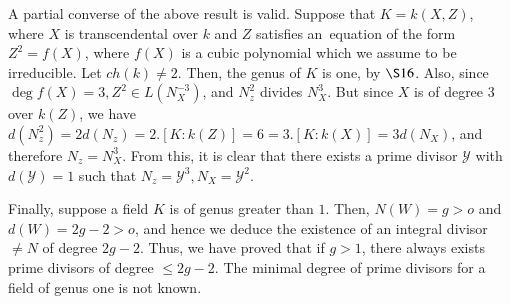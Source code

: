 A partial converse of the above result is valid. Suppose that $K = k
(X, Z)$, where $X$ is transcendental over $k$ and $Z$ satisfies an\pageoriginale\
equation of the form $Z^2 = f (X)$, where $f(X)$ is a cubic polynomial
which we assume to be irreducible. Let $ch(k) \neq 2$. Then, the genus
of $K$ is one, by $\S 16$. Also, since $\deg f(X) = 3, Z^2 \in L
(N^{-3}_{X})$, and $N^2_z$ divides $N^3_{X}$. But
since $X$ is of degree $3$ over $k(Z)$, we have $d (N^2_z) = 2d (N_z)
= 2. [K : k (Z)] = 6 = 3. [K : k(X)] = 3d (N_{X})$, and
therefore $N_z= N^3_{X}$. From this, it is clear that there
exists a prime divisor $\mathscr{Y}$ with $d(\mathscr{Y}) = 1$ such
that $N_z = \mathscr{Y}^3, N_{X} = \mathscr{Y}^2$. 

Finally, suppose a field $K$ is of genus greater than $1$. Then, $N(W)
= g > o$ and $d(W) = 2g - 2 > o$, and hence we deduce the existence of
an integral divisor $\neq N$ of degree $2g - 2$. Thus, we have proved
that if $g > 1$, there always exists prime divisors of degree $\le 2g
- 2$. The minimal degree of prime divisors for a field of genus one is
not known. 
